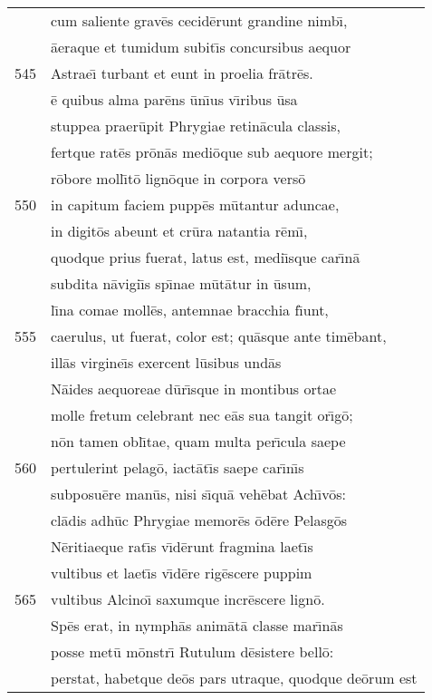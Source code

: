 \documentclass[paper=6in:9in,pagesize=pdftex,
               headinclude=on,footinclude=on,12pt]{scrbook}
\begin{document}
\begin{longtable}[p]{ r l }
 & cum saliente grav\=es cecid\=erunt grandine nimb\={\i},\\ 
 & \=aeraque et tumidum subit\={\i}s concursibus aequor\\ 
545 & Astrae\={\i} turbant et eunt in proelia fr\=atr\=es.\\ 
 & \=e quibus alma par\=ens \=un\={\i}us v\={\i}ribus \=usa\\ 
 & stuppea praer\=upit Phrygiae retin\=acula classis,\\ 
 & fertque rat\=es pr\=on\=as medi\=oque sub aequore mergit;\\ 
 & r\=obore moll\={\i}t\=o lign\=oque in corpora vers\=o\\ 
550 & in capitum faciem pupp\=es m\=utantur aduncae,\\ 
 & in digit\=os abeunt et cr\=ura natantia r\=em\={\i},\\ 
 & quodque prius fuerat, latus est, medi\={\i}sque car\={\i}n\=a\\ 
 & subdita n\=avigi\={\i}s sp\={\i}nae m\=ut\=atur in \=usum,\\ 
 & l\={\i}na comae moll\=es, antemnae bracchia f\={\i}unt,\\ 
555 & caerulus, ut fuerat, color est; qu\=asque ante tim\=ebant,\\ 
 & ill\=as virgine\={\i}s exercent l\=usibus und\=as\\ 
 & N\=aides aequoreae d\=ur\={\i}sque in montibus ortae\\ 
 & molle fretum celebrant nec e\=as sua tangit or\={\i}g\=o;\\ 
 & n\=on tamen obl\={\i}tae, quam multa per\={\i}cula saepe\\ 
560 & pertulerint pelag\=o, iact\=at\={\i}s saepe car\={\i}n\={\i}s\\ 
 & subposu\=ere man\=us, nisi s\={\i}qu\=a veh\=ebat Ach\={\i}v\=os:\\ 
 & cl\=adis adh\=uc Phrygiae memor\=es \=od\=ere Pelasg\=os\\ 
 & N\=eritiaeque rat\={\i}s v\={\i}d\=erunt fragmina laet\={\i}s\\ 
 & vultibus et laet\={\i}s v\={\i}d\=ere rig\=escere puppim\\ 
565 & vultibus Alcino\={\i} saxumque incr\=escere lign\=o.\\ 
 & \indent Sp\=es erat, in nymph\=as anim\=at\=a classe mar\={\i}n\=as\\ 
 & posse met\=u m\=onstr\={\i} Rutulum d\=esistere bell\=o:\\ 
 & perstat, habetque de\=os pars utraque, quodque de\=orum est\\ 

\end{longtable}
\end{document}
